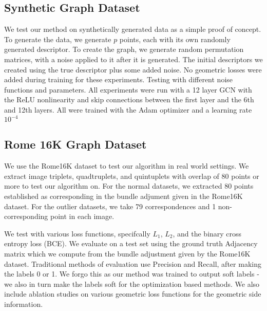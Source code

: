 \documentclass[10pt,twocolumn,letterpaper]{article}
\begin{document}
\subsection{Synthetic Graph Dataset}
We test our method on synthetically generated data as a simple proof of concept.
To generate the data, we generate $p$ points, each with its own randomly generated descriptor.
To create the graph, we generate random permutation matrices, with a noise applied to it after it is generated.
The initial descriptors we created using the true descriptor plus some added noise.
No geometric losses were added during training for these experiments.
Testing with different noise functions and parameters.
All experiments were run with a 12 layer GCN with the ReLU nonlinearity and skip connections between the first layer and the 6th and 12th layers.
All were trained with the Adam optimizer and a learning rate $10^{-4}$


\subsection{Rome 16K Graph Dataset}
We  use the Rome16K dataset \cite{li2010location} to test our algorithm in real world settings.
We extract image triplets, quadtruplets, and quintuplets with overlap of 80 points or more to test our algorithm on. For the normal datasets, we extracted 80 points established as corresponding in the bundle adjument given in the Rome16K dataset. For the outlier datasets, we take 79 correspondences and 1 non-corresponding point in each image.

We test with various loss functions, specifcally $L_1$, $L_2$, and the binary cross entropy loss (BCE).
We evaluate on a test set using the ground truth Adjacency matrix which we compute from the bundle adjustment given by the Rome16K dataset.
Traditional methods of evaluation use Precision and Recall, after making the labels 0 or 1.
We forgo this as our method was trained to output soft labels - we also in turn make the labels soft for the optimization based methods.
We also include ablation studies on various geometric loss functions for the geometric side information.

\end{document}
